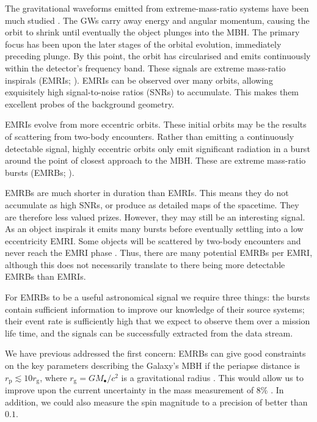 \documentclass[useAMS,usedcolumn,usegraphicx,usenatbib]{mn2e}
\newcommand{\sub}[1]{\ensuremath{_\mathrm{#1}}}
\begin{document}
The gravitational waveforms emitted from extreme-mass-ratio systems have been much studied \citep{Glampedakis2005, Barack2009}. The GWs carry away energy and angular momentum, causing the orbit to shrink until eventually the object plunges into the MBH. The primary focus has been upon the later stages of the orbital evolution, immediately preceding plunge. By this point, the orbit has circularised and emits continuously within the detector's frequency band. These signals are extreme mass-ratio inspirals (EMRIs; \citealt{Amaro-Seoane2007}). EMRIs can be observed over many orbits, allowing exquisitely high signal-to-noise ratios (SNRs) to accumulate. This makes them excellent probes of the background geometry.

EMRIs evolve from more eccentric orbits. These initial orbits may be the results of scattering from two-body encounters. Rather than emitting a continuously detectable signal, highly eccentric orbits only emit significant radiation in a burst around the point of closest approach to the MBH. These are extreme mass-ratio bursts (EMRBs; \citealt*{Rubbo2006}).

EMRBs are much shorter in duration than EMRIs. This means they do not accumulate as high SNRs, or produce as detailed maps of the spacetime. They are therefore less valued prizes. However, they may still be an interesting signal. As an object inspirals it emits many bursts before eventually settling into a low eccentricity EMRI. Some objects will be scattered by two-body encounters and never reach the EMRI phase \citep{Alexander2003}. Thus, there are many potential EMRBs per EMRI, although this does not necessarily translate to there being more detectable EMRBs than EMRIs.

For EMRBs to be a useful astronomical signal we require three things: the bursts contain sufficient information to improve our knowledge of their source systems; their event rate is sufficiently high that we expect to observe them over a mission life time, and the signals can be successfully extracted from the data stream.

We have previous addressed the first concern: EMRBs can give good constraints on the key parameters describing the Galaxy's MBH if the periapse distance is $r\sub{p} \lesssim 10 r\sub{g}$, where $r\sub{g} = GM_\bullet/c^2$ is a gravitational radius \citep{Berry2012}. This would allow us to improve upon the current uncertainty in the mass measurement of $8\%$ \citep{Gillessen2009}. In addition, we could also measure the spin magnitude to a precision of better than $0.1$.
\end{document}
